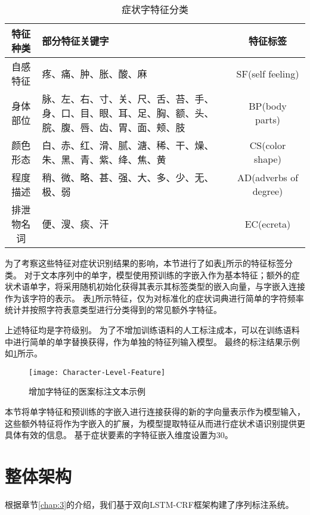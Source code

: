 \begin{table}[H]
    \centering
    \footnotesize
    \setlength{\tabcolsep}{4pt}
    \renewcommand{\arraystretch}{1.2}
    \caption{症状字特征分类}
    \begin{tabular}{cp{5cm}c}
        \toprule
        特征种类 & 部分特征关键字 & 特征标签\\
        \midrule
        自感特征 & 疼、痛、肿、胀、酸、麻 & SF(self feeling)\\
        \midrule
        身体部位 & 脉、左、右、寸、关、尺、舌、苔、手、身、口、目、眼、耳、足、胸、额、头、脘、腹、唇、齿、胃、面、颊、肢 & BP(body parts)\\
        \midrule
        颜色形态 & 白、赤、红、滑、腻、溏、稀、干、燥、朱、黑、青、紫、绛、焦、黄 & CS(color shape)\\
        \midrule
        程度描述 & 稍、微、略、甚、强、大、多、少、无、极、弱 & AD(adverbs of degree) \\
        \midrule
        排泄物名词 & 便、溲、痰、汗 & EC(ecreta)\\
        \bottomrule
    \end{tabular}
    \label{tab:symptom_cluster}
\end{table}
为了考察这些特征对症状识别结果的影响，本节进行了如表\ref{tab:symptom_cluster}所示的特征标签分类。
对于文本序列中的单字，模型使用预训练的字嵌入作为基本特征；额外的症状术语单字，将采用随机初始化获得其表示其标签类型的嵌入向量，与字嵌入连接作为该字符的表示。
表\ref{tab:symptom_cluster}所示特征，仅为对标准化的症状词典进行简单的字符频率统计并按照字符表意类型进行分类得到的常见额外字特征。

上述特征均是字符级别。
为了不增加训练语料的人工标注成本，可以在训练语料中进行简单的单字替换获得，作为单独的特征列输入模型。
最终的标注结果示例如\ref{fig:character_level_feature}所示。
\begin{figure}[H]
    \centering
    \texttt{[image: Character-Level-Feature]}
    \caption{增加字特征的医案标注文本示例}
    \label{fig:character_level_feature}
\end{figure}

本节将单字特征和预训练的字嵌入进行连接获得的新的字向量表示作为模型输入，这些额外特征将作为字嵌入的扩展，为模型提取特征从而进行症状术语识别提供更具体有效的信息。
基于症状要素的字特征嵌入维度设置为30。

\section{整体架构}
根据章节\ref{chap:3}的介绍，我们基于双向LSTM-CRF框架构建了序列标注系统。

